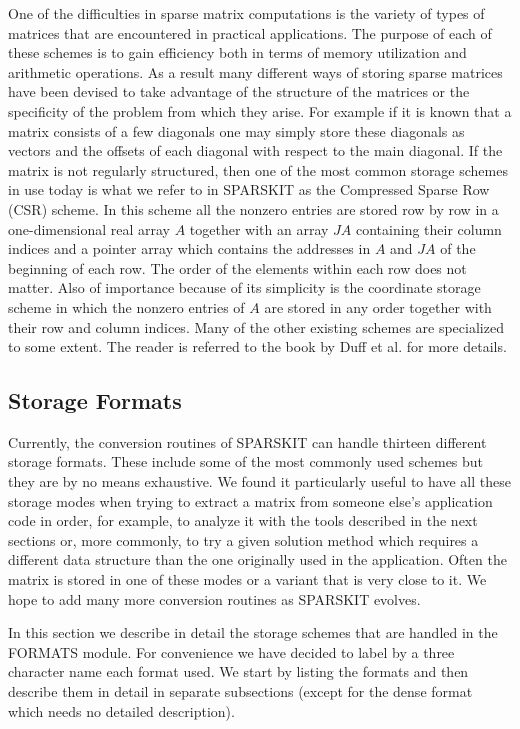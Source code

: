 \documentclass[12pt]{article}
\begin{document}
One of the difficulties in sparse matrix computations is the variety
of types of matrices that are encountered in practical applications.
The purpose of each of these schemes is to gain efficiency both in
terms of memory utilization and arithmetic operations.  As a result
many different ways of storing sparse matrices have been devised to
take advantage of the structure of the matrices or the specificity of
the problem from which they arise.  For example if it is known that a
matrix consists of a few diagonals one may simply store these
diagonals as vectors and the offsets of each diagonal with respect to
the main diagonal.  If the matrix is not regularly structured, then
one of the most common storage schemes in use today is what we refer
to in SPARSKIT as the Compressed Sparse Row (CSR) scheme. In this
scheme all the nonzero entries are stored row by row  in a 
one-dimensional real array $A$ together with an array $JA$ containing
their column indices and a pointer array which contains the addresses
in $A$ and $JA$ of the beginning of each row. The order of the elements 
within each row does not matter. Also of importance
because of its simplicity is the coordinate storage scheme in which
the nonzero entries of $A$ are stored in any order together with their
row and column indices.  Many of the other existing schemes are
specialized to some extent. The reader is
referred to the book by Duff et al. \cite{Duff-book} for more details.

\subsection{Storage Formats} 	
Currently, 
the conversion routines of SPARSKIT can handle thirteen different storage
formats. These include some of the most commonly used schemes but they
are by no means exhaustive.  We found it particularly useful to have
all these storage modes when trying to extract a matrix from someone
else's application code in order, for example, to analyze it with the
tools described in the next sections or, more commonly, to try a given
solution method which requires a different data structure than the
one originally used in the application.  Often the matrix is stored in
one of these modes or a variant that is very close to it.  We hope to
add many more conversion routines as SPARSKIT evolves.

In this section we describe in detail the storage schemes that are
handled in the FORMATS module.  For convenience we have decided to
label by a three character name each format used.  We start by listing
the formats and then describe them in detail  in separate subsections
(except for the dense format which needs no detailed description).	
\end{document}
